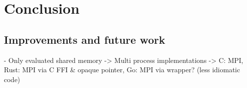 \chapter{Conclusion}
\label{ch:Conclusion}


\section{Improvements and future work}
\label{sec:Conclusion::Improvements}

- Only evaluated shared memory
    -> Multi process implementations
    -> C: MPI, Rust: MPI via C FFI \& opaque pointer, Go: MPI via wrapper? (less idiomatic code)

